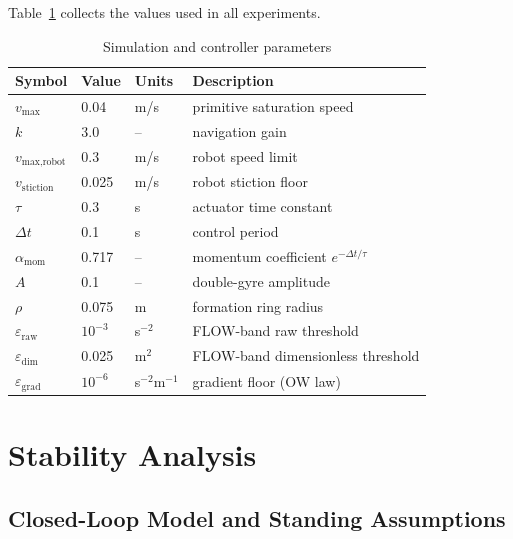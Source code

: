 \documentclass[lettersize,journal]{IEEEtran}
\begin{document}
Table~\ref{tab:params} collects the values used in all experiments.

\begin{table}[!t]
\centering
\caption{Simulation and controller parameters}
\label{tab:params}
\footnotesize
\setlength{\tabcolsep}{4pt}
\begin{tabular}{llll}
\hline
\textbf{Symbol} & \textbf{Value} & \textbf{Units} & \textbf{Description} \\
\hline
$v_{\max}$ & 0.04 & m/s & primitive saturation speed \\
$k$ & 3.0 & -- & navigation gain \\
$v_{\text{max,robot}}$ & 0.3 & m/s & robot speed limit \\
$v_{\text{stiction}}$ & 0.025 & m/s & robot stiction floor \\
$\tau$ & 0.3 & s & actuator time constant \\
$\Delta t$ & 0.1 & s & control period \\
$\alpha_{\text{mom}}$ & 0.717 & -- & momentum coefficient $e^{-\Delta t/\tau}$ \\
$A$ & 0.1 & -- & double-gyre amplitude \\
$\rho$ & 0.075 & m & formation ring radius \\
$\varepsilon_{\text{raw}}$ & $10^{-3}$ & s$^{-2}$ & FLOW-band raw threshold \\
$\varepsilon_{\text{dim}}$ & 0.025 & m$^{2}$ & FLOW-band dimensionless threshold \\
$\varepsilon_{\text{grad}}$ & $10^{-6}$ & s$^{-2}$m$^{-1}$ & gradient floor (OW law) \\
\hline
\end{tabular}
\end{table}


\section{Stability Analysis}
\label{sec:stability}

\subsection{Closed-Loop Model and Standing Assumptions}
\end{document}
